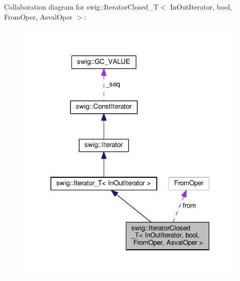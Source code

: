 Collaboration diagram for swig\+:\+:Iterator\+Closed\+\_\+T$<$ In\+Out\+Iterator, bool, From\+Oper, Asval\+Oper $>$\+:
\nopagebreak
\begin{figure}[H]
\begin{center}
\leavevmode
\includegraphics[width=316pt]{classswig_1_1IteratorClosed__T_3_01InOutIterator_00_01bool_00_01FromOper_00_01AsvalOper_01_4__coll__graph}
\end{center}
\end{figure}
